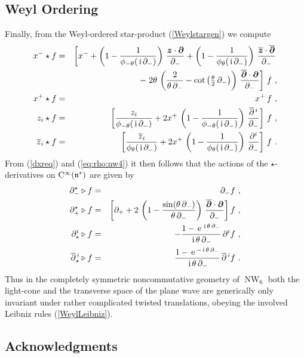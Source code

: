 \documentclass[11pt,a4paper]{article}
\DeclareMathOperator{\NW}{NW}
\newcommand{\mbf}[1]{{\boldsymbol {#1} }}
\def\ii{{\,{\rm i}\,}}
\def\CC{{\rm C}}
\def\mz{{\mbf z}}
\def\mdell{{\mbf\partial}}
\def\mfn{{\mathfrak n}}
\def\e{{\,\rm e}\,}
\def\bea{\begin{eqnarray}}
\def\eea{\end{eqnarray}}
\begin{document}
\subsection{Weyl Ordering \label{Weylderiv}}

Finally, from the Weyl-ordered star-product (\ref{Weylstargen}) we
compute
\bea
x^-\star f&=&\left[x^-+\left(1-\frac1{\phi_{-\theta}(\ii\partial_-)}
\right)\,\frac{\mz\cdot\mdell}{\partial_-}+
\left(1-\frac1{\phi_{\theta}(\ii\partial_-)}
\right)\,\frac{\overline{\mz}\cdot\overline{\mdell}}{\partial_-}
\right.\nonumber\\ &&\qquad-\left.2\theta\,\left(\frac{2}
{\theta\,\partial_-}-\cot\left(\mbox{$\frac\theta2\,\partial_-$}
\right)\right)\,\frac{\overline{\mdell}
\cdot\mdell}{\partial_-}\right]\,f \ , \nonumber\\
x^+\star f&=&x^+\,f \ , \nonumber\\
z_i\star f&=&\left[\frac{z_i}{\phi_{-\theta}(\ii\partial_-)}+
2x^+\,\left(1-\frac1{\phi_{-\theta}(\ii\partial_-)}\right)\,
\frac{\overline{\partial}{}^{\,i}}{\partial_-}\right]\,f \ ,
\nonumber\\ \overline{z}_i\star f&=&
\left[\frac{\overline{z}_i}{\phi_{\theta}(\ii\partial_-)}+
2x^+\,\left(1-\frac1{\phi_{\theta}(\ii\partial_-)}\right)\,
\frac{\partial^i}{\partial_-}\right]\,f \ .
\label{Weylxfprods}\eea
From (\ref{dxreq}) and (\ref{eq:rho:nw4}) it then follows that the
actions of the $\star$-derivatives on $\CC^\infty(\mfn^*)$ are given
by
\bea
\partial_-^\star\triangleright f&=&\partial_-f \ , \nonumber\\
\partial_+^\star\triangleright f&=&\left[\partial_++2\,
\left(1-\frac{\sin(\theta\,\partial_-)}{\theta\,\partial_-}
\right)\,\frac{\overline{\mdell}\cdot\mdell}{\partial_-}
\right]f \ , \nonumber\\ \partial_\star^i\triangleright f&=&
-\frac{1-\e^{\ii\theta\,\partial_-}}{\ii\theta\,\partial_-}\,
\partial^if \ , \nonumber\\ \overline{\partial}{}_\star^{\,i}
\triangleright f&=&\frac{1-\e^{-\ii\theta\,\partial_-}}
{\ii\theta\,\partial_-}\,\overline{\partial}{}^{\,i}f \ .
\label{Weylderivs}\eea
Thus in the completely symmetric noncommutative geometry of $\NW_6$ both the
light-cone and the transverse space of the plane wave are generically
only invariant under rather complicated twisted translations, obeying
the involved Leibniz rules (\ref{WeylLeibniz}).

\subsection*{Acknowledgments}
\end{document}
